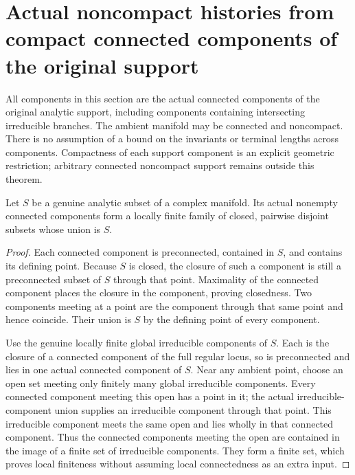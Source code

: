 \section{Actual noncompact histories from compact connected components of the original support}

All components in this section are the actual connected components of the
original analytic support, including components containing intersecting
irreducible branches. The ambient manifold may be connected and noncompact.
There is no assumption of a bound on the invariants or terminal lengths
across components. Compactness of each support component is an explicit
geometric restriction; arbitrary connected noncompact support remains outside
this theorem.

\begin{lemma}
\label{hir:original-analytic-support-connected-components-locally-finite}
\leanok
Let $S$ be a genuine analytic subset of a complex manifold. Its actual
nonempty connected components form a locally finite family of closed,
pairwise disjoint subsets whose union is $S$.
\end{lemma}
\begin{proof}
Each connected component is preconnected, contained in $S$, and contains
its defining point. Because $S$ is closed, the closure of such a component
is still a preconnected subset of $S$ through that point. Maximality of
the connected component places the closure in the component, proving
closedness. Two components meeting at a point are the component through
that same point and hence coincide. Their union is $S$ by the defining
point of every component.

Use the genuine locally finite global irreducible components of $S$.
Each is the closure of a connected component of the full regular locus,
so is preconnected and lies in one actual connected component of $S$.
Near any ambient point, choose an open set meeting only finitely many
global irreducible components. Every connected component meeting this
open has a point in it; the actual irreducible-component union supplies
an irreducible component through that point. This irreducible component
meets the same open and lies wholly in that connected component. Thus
the connected components meeting the open are contained in the image
of a finite set of irreducible components. They form a finite set,
which proves local finiteness without assuming local connectedness as
an extra input.
\end{proof}

